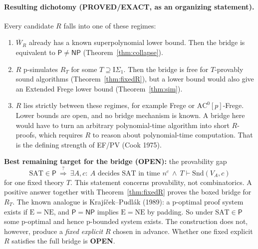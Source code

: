 \documentclass[11pt]{article}
\newcommand{\Pclass}{\mathsf P}
\newcommand{\NP}{\mathsf{NP}}
\newcommand{\SAT}{\mathrm{SAT}}
\newcommand{\Wbar}{\overline W}
\newcommand{\Snd}{\mathrm{Snd}}
\begin{document}
\paragraph{Resulting dichotomy (PROVED/EXACT, as an organizing statement).}
Every candidate $R$ falls into one of these regimes:
\begin{enumerate}
\item $\Wbar_R$ already has a known superpolynomial lower bound. Then the
  bridge is equivalent to $\Pclass\ne\NP$ (Theorem~\ref{thm:collapse}).
\item $R$ p-simulates $R_T$ for some $T\supseteq\mathrm{I}\Sigma_1$. Then the
  bridge is free for $T$-provably sound algorithms (Theorem~\ref{thm:fixedR}),
  but a lower bound would also give an Extended Frege lower bound
  (Theorem~\ref{thm:sim}).
\item $R$ lies strictly between these regimes, for example Frege or
  $\mathrm{AC}^0[p]$-Frege. Lower bounds are open, and no bridge mechanism is
  known. A bridge here would have to turn an arbitrary polynomial-time
  algorithm into short $R$-proofs, which requires $R$ to reason about
  polynomial-time computation. That is the defining strength of EF/PV
  (Cook 1975).
\end{enumerate}
\textbf{Best remaining target for the bridge (OPEN):} the provability gap
\[
\SAT\in\Pclass\ \overset{?}{\Longrightarrow}\ \exists A,c:\ A\text{ decides SAT in time }n^c
\ \wedge\ T\vdash\Snd(V_A,c)
\]
for one fixed theory $T$. This statement concerns provability, not
combinatorics. A positive answer together with Theorem~\ref{thm:fixedR} proves
the boxed bridge for $R_T$. The known analogue is Krajíček--Pudlák (1989): a
p-optimal proof system exists if $\mathrm{E}=\mathrm{NE}$, and $\Pclass=\NP$
implies $\mathrm{E}=\mathrm{NE}$ by padding. So under $\SAT\in\Pclass$ some
p-optimal and hence p-bounded system exists. The construction does not, however,
produce a \emph{fixed explicit} $R$ chosen in advance. Whether one fixed
explicit $R$ satisfies the full bridge is \textbf{OPEN}.
\end{document}
